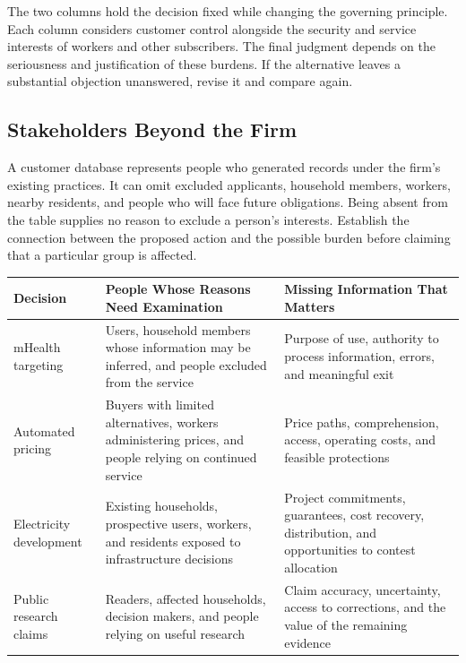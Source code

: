 The two columns hold the decision fixed while changing the governing
principle. Each column considers customer control alongside the security
and service interests of workers and other subscribers. The final
judgment depends on the seriousness and justification of these burdens.
If the alternative leaves a substantial objection unanswered, revise it
and compare again.

\hypertarget{M09-stakeholders-beyond-the-firm}{%
\subsection{Stakeholders Beyond the
Firm}\label{M09-stakeholders-beyond-the-firm}}

\noindent \noindent A customer database represents people who generated records
under the firm's existing practices. It can omit excluded applicants,
household members, workers, nearby residents, and people who will face
future obligations. Being absent from the table supplies no reason to
exclude a person's interests. Establish the connection between the
proposed action and the possible burden before claiming that a
particular group is affected.

\begin{table}[H]
\centering\small
\begin{tabular}{@{}
  >{\raggedright\arraybackslash}p{}
  >{\raggedright\arraybackslash}p{}
  >{\raggedright\arraybackslash}p{}@{}}
\toprule
Decision & People Whose Reasons Need Examination & Missing Information
That Matters \\
\midrule

mHealth targeting & Users, household members whose information may be
inferred, and people excluded from the service & Purpose of use,
authority to process information, errors, and meaningful exit \\
Automated pricing & Buyers with limited alternatives, workers
administering prices, and people relying on continued service & Price
paths, comprehension, access, operating costs, and feasible
protections \\
Electricity development & Existing households, prospective users,
workers, and residents exposed to infrastructure decisions & Project
commitments, guarantees, cost recovery, distribution, and opportunities
to contest allocation \\
Public research claims & Readers, affected households, decision makers,
and people relying on useful research & Claim accuracy, uncertainty,
access to corrections, and the value of the remaining evidence \\
\bottomrule
\end{tabular}
\end{table}

